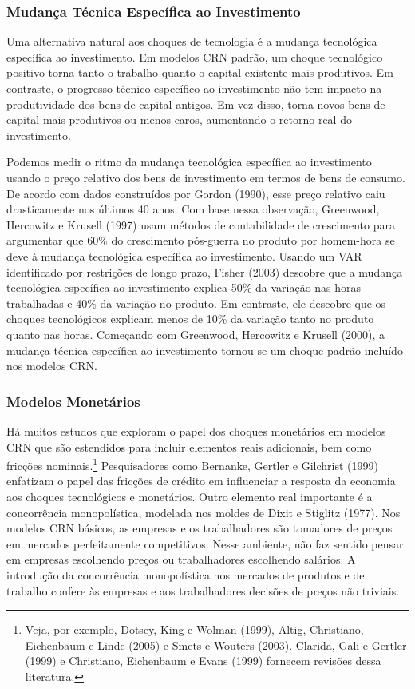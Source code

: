 \documentclass[12pt]{article}
\begin{document}
\subsubsection*{Mudança Técnica Específica ao Investimento}

Uma alternativa natural aos choques de tecnologia é a mudança tecnológica específica ao investimento. Em modelos CRN padrão, um choque tecnológico positivo torna tanto o trabalho quanto o capital existente mais produtivos. Em contraste, o progresso técnico específico ao investimento não tem impacto na produtividade dos bens de capital antigos. Em vez disso, torna novos bens de capital mais produtivos ou menos caros, aumentando o retorno real do investimento.

Podemos medir o ritmo da mudança tecnológica específica ao investimento usando o preço relativo dos bens de investimento em termos de bens de consumo. De acordo com dados construídos por Gordon (1990), esse preço relativo caiu drasticamente nos últimos 40 anos. Com base nessa observação, Greenwood, Hercowitz e Krusell (1997) usam métodos de contabilidade de crescimento para argumentar que 60\% do crescimento pós-guerra no produto por homem-hora se deve à mudança tecnológica específica ao investimento. Usando um VAR identificado por restrições de longo prazo, Fisher (2003) descobre que a mudança tecnológica específica ao investimento explica 50\% da variação nas horas trabalhadas e 40\% da variação no produto. Em contraste, ele descobre que os choques tecnológicos explicam menos de 10\% da variação tanto no produto quanto nas horas. Começando com Greenwood, Hercowitz e Krusell (2000), a mudança técnica específica ao investimento tornou-se um choque padrão incluído nos modelos CRN.

\subsubsection*{Modelos Monetários}

Há muitos estudos que exploram o papel dos choques monetários em modelos CRN que são estendidos para incluir elementos reais adicionais, bem como fricções nominais.\footnote{Veja, por exemplo, Dotsey, King e Wolman (1999), Altig, Christiano, Eichenbaum e Linde (2005) e Smets e Wouters (2003). Clarida, Gali e Gertler (1999) e Christiano, Eichenbaum e Evans (1999) fornecem revisões dessa literatura.} Pesquisadores como Bernanke, Gertler e Gilchrist (1999) enfatizam o papel das fricções de crédito em influenciar a resposta da economia aos choques tecnológicos e monetários. Outro elemento real importante é a concorrência monopolística, modelada nos moldes de Dixit e Stiglitz (1977). Nos modelos CRN básicos, as empresas e os trabalhadores são tomadores de preços em mercados perfeitamente competitivos. Nesse ambiente, não faz sentido pensar em empresas escolhendo preços ou trabalhadores escolhendo salários. A introdução da concorrência monopolística nos mercados de produtos e de trabalho confere às empresas e aos trabalhadores decisões de preços não triviais.
\end{document}
